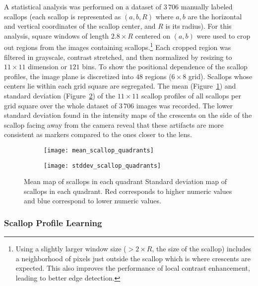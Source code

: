 A statistical analysis was performed on  a dataset of $3\,706$ manually labeled scallops 
(each scallop is represented as $(a,b,R)$ 
where $a,b$ are the horizontal and vertical coordinates of the scallop center, 
and $R$ is its radius). 
For this analysis, square windows of length $2.8\times R$ 
centered on $(a,b)$ were used to crop out regions from the images containing scallops.\footnote{Using a slightly 
larger window size ($>2\times R$, the size of the scallop) includes
a neighborhood of pixels just outside the scallop which is where 
crescents are expected.
This also improves the performance of local contrast enhancement, leading to better edge detection.}
Each cropped region was filtered in grayscale, contrast stretched, and then normalized
by resizing to $11 \times 11$ dimension or $121$ bins.
To show the positional dependence of the scallop profiles,
the image plane is discretized into $48$ regions ($6\times8$ grid).
Scallops whose centers lie within each grid square are segregated.
The mean (Figure~\ref{subfig:mean_quadrant}) and standard deviation (Figure~\ref{subfig:stddev_quadrant}) 
of the $11 \times 11$ scallop profiles of all scallops per grid square 
over the whole dataset of $3\,706$ images was recorded.
The lower standard deviation found in the intensity maps of the crescents on the side of the scallop facing away from the camera reveal that these artifacts are more consistent as markers compared to the ones closer to the lens. 


\begin{figure*}
  \centering
  \begin{subfigure}[]{0.45\textwidth}
      \texttt{[image: mean\_scallop\_quadrants]}
      \caption{}
      \label{subfig:mean_quadrant}
  \end{subfigure}
  \begin{subfigure}[]{0.45\textwidth}
      \texttt{[image: stddev\_scallop\_quadrants]}        
      \caption{}
      \label{subfig:stddev_quadrant}
  \end{subfigure}
  \caption[Mean and variance map of scallops in each quadrant]{ Mean map of scallops in each quadrant  Standard deviation map of scallops in each quadrant.
  Red corresponds to higher numeric values and blue correspond to lower numeric values.}
  \label{fig:mean_stddev_quadrant}
\end{figure*}



\subsubsection{Scallop Profile Learning} \label{subsubsec:scallop_profile_learning}

